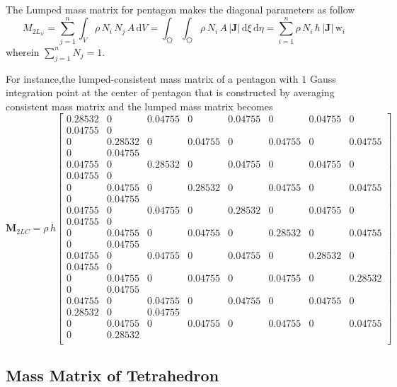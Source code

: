 The Lumped mass matrix for pentagon makes the diagonal parameters as follow
\begin{equation}
{M}_{2L_{ii}} = \sum_{j=1}^n \int_{V}  \rho \, N_i \, N_j \, A \, \mathrm{d} V  = \int_{\pentagon} \int_{\pentagon} \rho \, N_i\, A \, |\mathbf{J}|\,  \mathrm{d} \xi \, \mathrm{d} \eta =  \sum_{i=1}^n  \rho  \, N_i\, h\, |\mathbf{J}| \, \mathrm{w}_i
\label{LumMass2D}
\end{equation}
wherein $\sum_{j=1}^n N_j = 1$. 

For instance,the lumped-consistent mass matrix of a pentagon  with $1$ Gauss integration point at the center of pentagon that is constructed by averaging consistent mass matrix and the lumped mass matrix becomes 
\begin{equation}
\mathbf{M}_{2LC}  = \rho \, h
\begin{bmatrix}
0.28532 & 0 & 0.04755 & 0 & 0.04755 & 0 & 0.04755 & 0 \\ 0.04755 & 0 \\
0 & 0.28532 & 0 & 0.04755 & 0 & 0.04755 & 0 & 0.04755\\ 0 & 0.04755
\\
0.04755 & 0 & 0.28532 & 0 & 0.04755 & 0 & 0.04755 & 0 \\ 0.04755 & 0\\
0 & 0.04755 & 0 & 0.28532 & 0 & 0.04755 & 0 & 0.04755\\ 0 & 0.04755 \\
0.04755 & 0 & 0.04755 & 0 & 0.28532 & 0 & 0.04755 & 0 \\ 0.04755 & 0 \\
0 & 0.04755 & 0 & 0.04755 & 0 & 0.28532 & 0 & 0.04755\\ 0 & 0.04755 \\
0.04755 & 0 & 0.04755 & 0 & 0.04755 & 0 & 0.28532 & 0\\ 0.04755 & 0\\
0 & 0.04755 & 0 & 0.04755 & 0 & 0.04755 & 0 & 0.28532\\ 0 & 0.04755\\
0.04755 & 0 & 0.04755 & 0 & 0.04755 & 0 & 0.04755 & 0 \\ 0.28532 & 0 & 0.04755\\
0 & 0.04755 & 0 & 0.04755 & 0 & 0.04755 & 0 & 0.04755\\ 0 & 0.28532\\
\end{bmatrix} 
\label{LumconsMassMatrix2D}
\end{equation}


\subsection{Mass Matrix of Tetrahedron}

